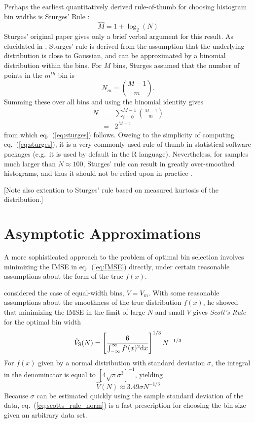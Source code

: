 \documentclass[12pt]{article}
\newcommand{\comment}[1]{{\color{blue} [#1]}}
\newcommand{\dd}{\mathrm{d}}
\newcommand{\eqn}[1]{eq.~(\ref{eq:#1})}
\begin{document}
Perhaps the earliest quantitatively derived rule-of-thumb for choosing
histogram bin widths is Sturges' Rule \citep{Sturges1926}:
\begin{equation}
  \label{eq:sturges}
  \hat{M} = 1 + \log_2(N)
\end{equation}
Sturges' original paper gives only a brief verbal argument for this result.
As elucidated in \citet{Scott2009}, Sturges' rule is derived from the
assumption that the underlying distribution is close to Gaussian, and
can be approximated by a binomial distribution within the bins.  For $M$ bins,
Sturges assumed that the number of points in the $m^{th}$ bin is 
\begin{equation}
  N_m = \binom{M - 1}{m}.
\end{equation}
Summing these over all bins and using the binomial identity gives
\begin{eqnarray}
  N &=& \sum_{i=0}^{M-1} \binom{M-1}{m}\\
    &=& 2^{M - 1}
\end{eqnarray}
from which \eqn{sturges} follows.
Oweing to the simplicity of computing \eqn{sturges}, it is a very commonly
used rule-of-thumb in statistical software packages (e.g.\ it is used by
default in the R language).  Nevertheless, for
samples much larger than $N \approx 100$, Sturges' rule can result in greatly
over-smoothed histograms, and thus it should not be relied upon in practice
\citep{Scott2009}.

\comment{Note also \citet{Doane1976} extention to Sturges' rule based on
  measured kurtosis of the distribution.}


\section{Asymptotic Approximations}
\label{sec:asymptotic_approx}
A more sophisticated approach to the problem of optimal bin selection
involves minimizing the IMSE in \eqn{IMSE} directly, under certain
reasonable assumptions about the form of the true $f(x)$.

\citet{Scott1979} considered the case of equal-width bins, $V=V_m$.
With some reasonable assumptions about the smoothness of the true
distribution $f(x)$, he showed that
minimizing the IMSE in the limit of large $N$ and small $V$ gives
{\it Scott's Rule} for the optimal bin width
\begin{equation}
  \label{eq:scotts_rule}
  \hat{V}_{\rm S}(N) = \left[\frac{6}{\int_{-\infty}^\infty f^\prime(x)^2 \dd x}\right]^{1/3}
  N^{-1/3}
\end{equation}
For $f(x)$ given by a normal distribution with standard deviation $\sigma$,
the integral in the denominator is equal to $[4\sqrt{\pi}\sigma^3]^{-1}$,
yielding
\begin{equation}
  \label{eq:scotts_rule_norm}
  \hat{V}(N)\approx 3.49 \sigma N^{-1/3}
\end{equation}
Because $\sigma$ can be estimated quickly using the sample standard deviation
of the data, \eqn{scotts_rule_norm} is a fast
prescription for choosing the bin size given an arbitrary data set.
\end{document}
